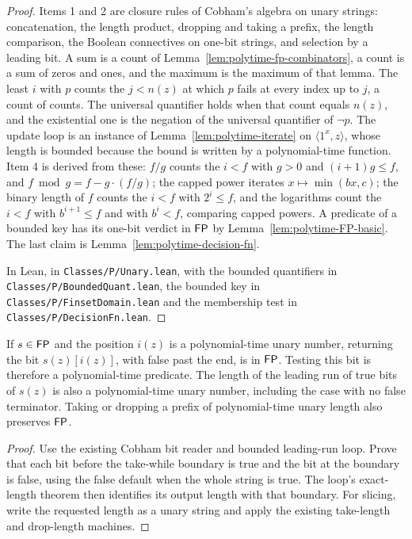 \begin{proof}
  \leanok
  Items 1 and 2 are closure rules of Cobham's algebra on unary strings:
  concatenation, the length product, dropping and taking a prefix, the length
  comparison, the Boolean connectives on one-bit strings, and selection by a
  leading bit. A sum is a count of Lemma~\ref{lem:polytime-fp-combinators}, a
  count is a sum of zeros and ones, and the maximum is the maximum of that
  lemma. The least $i$ with $p$ counts the $j < n(z)$ at which $p$ fails at
  every index up to $j$, a count of counts. The universal quantifier holds
  when that count equals $n(z)$, and the existential one is the negation of
  the universal quantifier of $\neg p$. The update loop is an instance of
  Lemma~\ref{lem:polytime-iterate} on $\langle 1^x, z \rangle$, whose length
  is bounded because the bound is written by a polynomial-time function.
  Item 4 is derived from these: $f / g$ counts the $i < f$ with $g > 0$ and
  $(i + 1) g \le f$, and $f \bmod g = f - g \cdot (f / g)$; the capped power
  iterates $x \mapsto \min(b x, c)$; the binary length of $f$ counts the
  $i < f$ with $2^i \le f$, and the logarithms count the $i < f$ with
  $b^{i+1} \le f$ and with $b^i < f$, comparing capped powers. A predicate of
  a bounded key has its one-bit verdict in $\mathsf{FP}$ by
  Lemma~\ref{lem:polytime-FP-basic}. The last claim is
  Lemma~\ref{lem:polytime-decision-fn}.

  In Lean, in \texttt{Classes/P/Unary.lean}, with the bounded quantifiers in
  \texttt{Classes/P/BoundedQuant.lean}, the bounded key in
  \texttt{Classes/P/FinsetDomain.lean} and the membership test in
  \texttt{Classes/P/DecisionFn.lean}.
\end{proof}

\begin{lemma}
  \label{lem:polytime-string-access}
  \leanok
  If $s\in\mathsf{FP}$ and the position $i(z)$ is a polynomial-time unary number,
  returning the bit $s(z)[i(z)]$, with false past the end, is in $\mathsf{FP}$.
  Testing this bit is therefore a polynomial-time predicate. The length of the
  leading run of true bits of $s(z)$ is also a polynomial-time unary number,
  including the case with no false terminator. Taking or dropping a prefix of
  polynomial-time unary length also preserves $\mathsf{FP}$.
\end{lemma}
\begin{proof}
  \leanok
  Use the existing Cobham bit reader and bounded leading-run loop. Prove that
  each bit before the take-while boundary is true and the bit at the boundary
  is false, using the false default when the whole string is true. The loop's
  exact-length theorem then identifies its output length with that boundary.
  For slicing, write the requested length as a unary string and apply the
  existing take-length and drop-length machines.
\end{proof}

